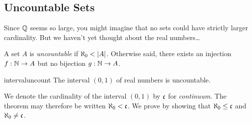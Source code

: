 \clearpage



\subsection{Uncountable Sets}\label{sec:uncountable}

Since $\mathbb{Q}$ seems so large, you might imagine that no sets could have strictly larger cardinality. But we haven't yet thought about the real numbers\ldots

\begin{defn}{}{}
	A set $A$ is \emph{uncountable} if $\aleph_0<\left| A\right|$. Otherwise said, there exists an injection $f:\mathbb{N}\to A$ but no bijection $g:\mathbb{N}\to A$.
\end{defn}

\begin{thm}{}{intervaluncount}
	The interval $(0,1)$ of real numbers is uncountable.
\end{thm}

We denote the cardinality of the interval $(0,1)$ by $\mathfrak{c}$ for \emph{continuum.} The theorem may therefore be written $\aleph_0<\mathfrak{c}$. We prove by showing that $\aleph_0\le\mathfrak{c}$ and $\aleph_0\neq\mathfrak{c}$.

